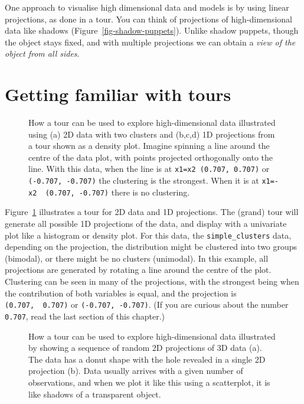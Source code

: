 \documentclass[
  letterpaper,
]{krantz}
\begin{document}
One approach to visualise high dimensional data and models is by using
linear projections, as done in a tour. You can think of projections of
high-dimensional data like shadows (Figure~\ref{fig-shadow-puppets}).
Unlike shadow puppets, though the object stays fixed, and with multiple
projections we can obtain a \emph{view of the object from all sides}.

\section{Getting familiar with tours}\label{getting-familiar-with-tours}

\begin{figure}


\caption{\label{fig-explain-1D-pdf}How a tour can be used to explore
high-dimensional data illustrated using (a) 2D data with two clusters
and (b,c,d) 1D projections from a tour shown as a density plot. Imagine
spinning a line around the centre of the data plot, with points
projected orthogonally onto the line. With this data, when the line is
at \texttt{x1=x2\ (0.707,\ 0.707)} or \texttt{(-0.707,\ -0.707)} the
clustering is the strongest. When it is at
\texttt{x1=-x2\ \ (0.707,\ -0.707)} there is no clustering.}

\end{figure}%

Figure~\ref{fig-explain-1D-pdf} illustrates a tour for 2D data and 1D
projections. The (grand) tour will generate all possible 1D projections
of the data, and display with a univariate plot like a histogram or
density plot. For this data, the \texttt{simple\_clusters} data,
depending on the projection, the distribution might be clustered into
two groups (bimodal), or there might be no clusters (unimodal). In this
example, all projections are generated by rotating a line around the
centre of the plot. Clustering can be seen in many of the projections,
with the strongest being when the contribution of both variables is
equal, and the projection is \texttt{(0.707,\ \ 0.707)} or
\texttt{(-0.707,\ -0.707)}. (If you are curious about the number
\texttt{0.707}, read the last section of this chapter.)


\begin{figure}


\caption{\label{fig-explain-2D-pdf}How a tour can be used to explore
high-dimensional data illustrated by showing a sequence of random 2D
projections of 3D data (a). The data has a donut shape with the hole
revealed in a single 2D projection (b). Data usually arrives with a
given number of observations, and when we plot it like this using a
scatterplot, it is like shadows of a transparent object.}

\end{figure}%
\end{document}

